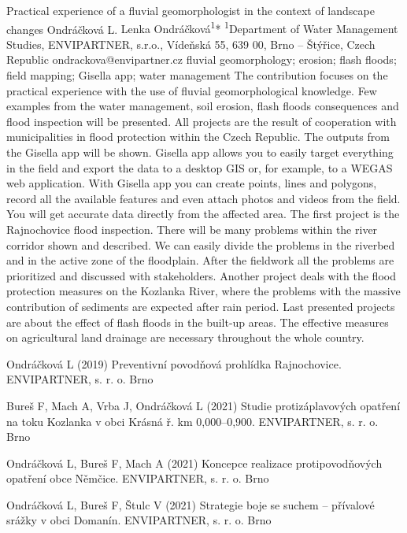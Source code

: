 \abstract
{Practical experience of a fluvial geomorphologist in the context of landscape changes} 
{Ondráčková L.} 
{Lenka Ondráčková\textsuperscript{1}*} 
{\TLtag} 
{
\textsuperscript{1}Department of Water Management Studies, ENVIPARTNER, s.r.o., Vídeňská 55,
	639 00, Brno – Štýřice, Czech Republic
}
{ondrackova@envipartner.cz}  %
{fluvial geomorphology; erosion; flash floods; field mapping; Gisella app; water management}
{The contribution focuses on the practical experience with the use of fluvial geomorphological knowledge. Few examples from the water management, soil erosion, flash floods consequences and flood inspection will be presented. All projects are the result of cooperation with municipalities in flood protection within the Czech Republic. The outputs from the Gisella app will be shown. Gisella app allows you to easily target everything in the field and export the data to a desktop GIS or, for example, to a WEGAS web application. With Gisella app you can create points, lines and polygons, record all the available features and even attach photos and videos from the field. You will get accurate data directly from the affected area. The first project is the Rajnochovice flood inspection. There will be many problems within the river corridor shown and described. We can easily divide the problems in the riverbed and in the active zone of the floodplain. After the fieldwork all the problems are prioritized and discussed with stakeholders. Another project deals with the flood protection measures on the Kozlanka River, where the problems with the massive contribution of sediments are expected after rain period. Last presented projects are about the effect of flash floods in the built-up areas. The effective measures on agricultural land drainage are necessary throughout the whole country. 
}
{Ondráčková L (2019) Preventivní povodňová prohlídka Rajnochovice. ENVIPARTNER, s. r. o. Brno

Bureš F, Mach A, Vrba J, Ondráčková L (2021) Studie protizáplavových opatření na toku Kozlanka v obci Krásná ř. km 0,000--0,900. ENVIPARTNER, s. r. o. Brno

Ondráčková L, Bureš F, Mach A (2021) Koncepce realizace protipovodňových opatření obce Němčice. ENVIPARTNER, s. r. o. Brno

Ondráčková L, Bureš F, Štulc V (2021) Strategie boje se suchem – přívalové srážky v obci Domanín. ENVIPARTNER, s. r. o. Brno 
}

